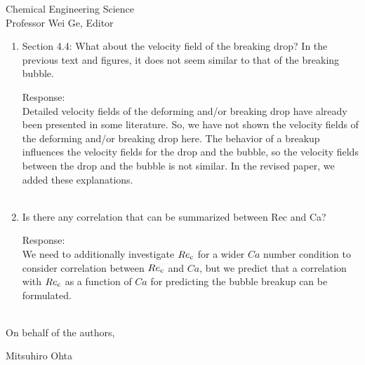 \documentclass{letter}
\begin{document}
\begin{letter}{
Chemical Engineering Science\\
Professor Wei Ge, Editor\\}
\begin{enumerate}
\par\noindent
\item
\textsf
{Section 4.4: What about the velocity field of the breaking drop? In the previous text and figures, it does not seem similar to that of the breaking bubble.}
\vspace{3 mm}

Response: \\
Detailed velocity fields of the deforming and/or breaking drop have already been presented in some literature.
So, we have not shown the velocity fields of the deforming and/or breaking drop here.
The behavior of a breakup influences the velocity fields for the drop and the bubble, so the velocity fields between the drop 
and the bubble is not similar.
In the revised paper, we added these explanations.  \\
\\


\par\noindent
\item
\textsf
{Is there any correlation that can be summarized between Rec and Ca?}
\vspace{3 mm}

Response: \\
We need to additionally investigate $Re_{\rm c}$ for a wider $Ca$ number condition to consider correlation between $Re_{\rm c}$ and $Ca$,
but we predict that a correlation with $Re_{\rm c}$ as a function of $Ca$ for predicting the bubble breakup can be formulated.\\
\\


\end{enumerate}

\closing{On behalf of the authors,}
Mitsuhiro Ohta

\end{letter}
\end{document}
